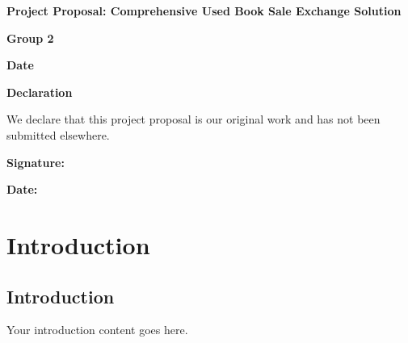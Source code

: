 \documentclass{article}
\begin{document}
\begin{titlepage}
    \centering
    \vspace*{\fill}
    \Huge\textbf{Project Proposal: Comprehensive Used Book Sale Exchange Solution}\par
    \vspace{1cm}
    \Large\textbf{Group 2}\par
    \vspace{1cm}
    \large\textbf{Date}\par
    \vspace*{\fill}
\end{titlepage}

\newpage
\begin{titlepage}
    \centering
    \vspace*{\fill}
    \Huge\textbf{Declaration}\par
    \vspace{1cm}
    \large
    We declare that this project proposal is our original work and has not been submitted elsewhere.\par
    \vspace{1cm}
    \large\textbf{Signature:} \underline{\hspace{6cm}}\par
    \vspace{1cm}
    \large\textbf{Date:} \underline{\hspace{3cm}}\par
    \vspace*{\fill}
\end{titlepage}

\newpage
\tableofcontents

\newpage
\section{Introduction}
\subsection{Introduction}
Your introduction content goes here.

\newpage
\end{document}
